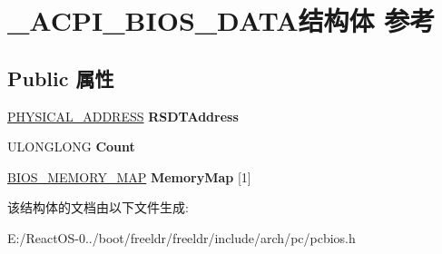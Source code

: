 \hypertarget{struct___a_c_p_i___b_i_o_s___d_a_t_a}{}\section{\+\_\+\+A\+C\+P\+I\+\_\+\+B\+I\+O\+S\+\_\+\+D\+A\+T\+A结构体 参考}
\label{struct___a_c_p_i___b_i_o_s___d_a_t_a}
\subsection*{Public 属性}
\begin{DoxyCompactItemize}
\item 
\mbox{\label{struct___a_c_p_i___b_i_o_s___d_a_t_a_a1a0cfd87ea490e586e6a8df5e28d09a1}} 
\hyperlink{union___l_a_r_g_e___i_n_t_e_g_e_r}{P\+H\+Y\+S\+I\+C\+A\+L\+\_\+\+A\+D\+D\+R\+E\+SS} {\bfseries R\+S\+D\+T\+Address}
\item 
\mbox{\label{struct___a_c_p_i___b_i_o_s___d_a_t_a_ad22fb3e0380b8a6f6d0d78bcd8080904}} 
U\+L\+O\+N\+G\+L\+O\+NG {\bfseries Count}
\item 
\mbox{\label{struct___a_c_p_i___b_i_o_s___d_a_t_a_a5d094013483a7f69df74085c3f3dda11}} 
\hyperlink{struct_b_i_o_s___m_e_m_o_r_y___m_a_p}{B\+I\+O\+S\+\_\+\+M\+E\+M\+O\+R\+Y\+\_\+\+M\+AP} {\bfseries Memory\+Map} \mbox{[}1\mbox{]}
\end{DoxyCompactItemize}


该结构体的文档由以下文件生成\+:\begin{DoxyCompactItemize}
\item 
E\+:/\+React\+O\+S-\/0../boot/freeldr/freeldr/include/arch/pc/pcbios.\+h\end{DoxyCompactItemize}
